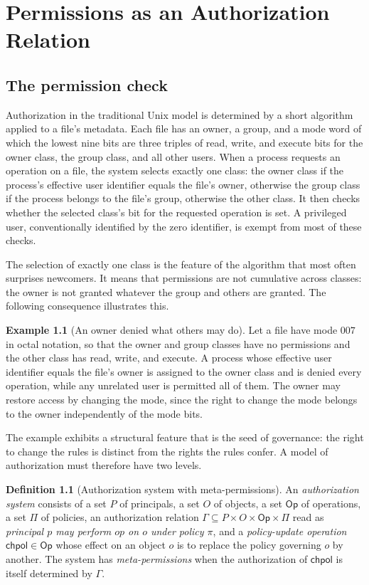 \documentclass[11pt,twoside,openright]{book}
\theoremstyle{plain}
\theoremstyle{definition}
\newtheorem{definition}[theorem]{Definition}
\newtheorem{example}[theorem]{Example}
\theoremstyle{remark}
\begin{document}
\chapter{Permissions as an Authorization Relation}\label{ch:permissions}

\section{The permission check}

Authorization in the traditional Unix model is determined by a short algorithm applied to a file's metadata. Each file has an owner, a group, and a mode word of which the lowest nine bits are three triples of read, write, and execute bits for the owner class, the group class, and all other users. When a process requests an operation on a file, the system selects exactly one class: the owner class if the process's effective user identifier equals the file's owner, otherwise the group class if the process belongs to the file's group, otherwise the other class. It then checks whether the selected class's bit for the requested operation is set. A privileged user, conventionally identified by the zero identifier, is exempt from most of these checks.

The selection of exactly one class is the feature of the algorithm that most often surprises newcomers. It means that permissions are not cumulative across classes: the owner is not granted whatever the group and others are granted. The following consequence illustrates this.

\begin{example}[An owner denied what others may do]\label{ex:ownerdenied}
Let a file have mode $007$ in octal notation, so that the owner and group classes have no permissions and the other class has read, write, and execute. A process whose effective user identifier equals the file's owner is assigned to the owner class and is denied every operation, while any unrelated user is permitted all of them. The owner may restore access by changing the mode, since the right to change the mode belongs to the owner independently of the mode bits.
\end{example}

The example exhibits a structural feature that is the seed of governance: the right to change the rules is distinct from the rights the rules confer. A model of authorization must therefore have two levels.

\begin{definition}[Authorization system with meta-permissions]\label{def:authsystem}
An \emph{authorization system} consists of a set $P$ of principals, a set $O$ of objects, a set $\mathsf{Op}$ of operations, a set $\Pi$ of policies, an authorization relation $\Gamma\subseteq P\times O\times\mathsf{Op}\times\Pi$ read as \emph{principal $p$ may perform $\mathit{op}$ on $o$ under policy $\pi$}, and a \emph{policy-update operation} $\mathsf{chpol}\in\mathsf{Op}$ whose effect on an object $o$ is to replace the policy governing $o$ by another. The system has \emph{meta-permissions} when the authorization of $\mathsf{chpol}$ is itself determined by $\Gamma$.
\end{definition}
\end{document}
